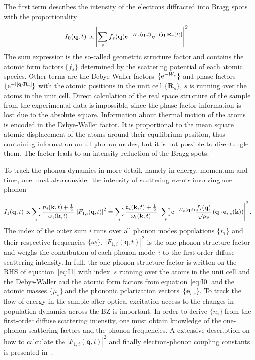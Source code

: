 The first term describes the intensity of the electrons diffracted into Bragg spots with the proportionality
\begin{equation} I_0(\mathbf{q}, t) \propto \left| \sum_s f_s(\mathbf{q}) \mathrm{e}^{-W_s(\mathbf{q},t)} \mathrm{e}^{-\mathrm{i}[\mathbf{q}\cdot\mathbf{R}_s(t)]} \right| ^2.\label{eq:I0}\end{equation}
The sum expression is the so-called geometric structure factor and contains the atomic form factors $\{f_s\}$ determined by the scattering potential of each atomic species.
Other terms are the Debye-Waller factors~$\{\mathrm{e}^{-W_s}\}$ and phase factors $\{\mathrm{e}^{-\mathrm{i}[\mathbf{q}\cdot\mathbf{R}_s]}\}$ with the atomic positions in the unit cell $\{\mathbf{R}_s\}$, $s$ is running over the atoms in the unit cell.
Direct calculation of the real space structure of the sample from the experimental data is impossible, since the phase factor information is lost due to the absolute square.
Information about thermal motion of the atoms is encoded in the Debye-Waller factor.
It is proportional to the mean square atomic displacement of the atoms around their equilibrium position, thus containing information on all phonon modes, but it is not possible to disentangle them.
The factor leads to an intensity reduction of the Bragg spots.

To track the phonon dynamics in more detail, namely in energy, momentum and time, one must also consider the intensity of scattering events involving one phonon

\begin{equation} I_1(\mathbf{q},t) \propto \sum_i \frac{n_{i}(\mathbf{k}, t)+\frac{1}{2}}{\omega_{i}(\mathbf{k}, t)}\,\left| F_{1,i}(\mathbf{q},t) \right|^2 = \sum_i \frac{n_{i}(\mathbf{k},t)+\frac{1}{2}}{\omega_{i}(\mathbf{k},t)}\,\left| \sum_s \mathrm{e}^{-W_s(\mathbf{q},t)} \frac{f_s(\mathbf{q})}{\sqrt{\mu_s}} \left(\mathbf{q}\cdot\mathbf{e}_{i, s}(\mathbf{k}) \right) \right|^2.\label{eq:I1}\end{equation}
The index of the outer sum $i$ runs over all phonon modes populations $\{n_{i}\}$ and their respective frequencies $\{\omega_{i}\}$.
$\left| F_{1,i}(\mathbf{q},t) \right|^2$ is the one-phonon structure factor and weighs the contribution of each phonon mode~$i$ to the first order diffuse scattering intensity.
In full, the one-phonon structure factor is written on the RHS of equation~\ref{eq:I1} with index~$s$ running over the atoms in the unit cell and the Debye-Waller and the atomic form factors from equation~\ref{eq:I0} and the atomic masses $\{\mu_s\}$ and the phononic polarization vectors~$\{\mathbf{e}_{i, s}\}$.
To track the flow of energy in the sample after optical excitation access to the changes in population dynamics across the \ac{BZ} is important.
In order to derive $\{n_{i}\}$ from the first-order diffuse scattering intensity, one must obtain knowledge of the one-phonon scattering factors and the phonon frequencies.
A extensive description on how to calculate the $\left| F_{1,i}(\mathbf{q},t) \right|^2$ and finally electron-phonon coupling constants is presented in~\cite{stern2018,renedecotret2019}.

